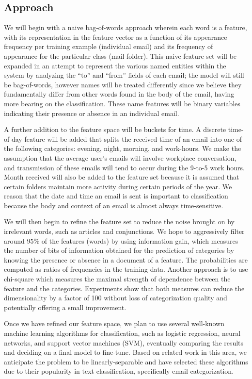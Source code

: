 \documentclass[11pt]{article}
\begin{document}
\subsection{Approach}
\label{sec-1-2}
We will begin with a naive bag-of-words approach wherein each word is a feature, with its representation in the feature vector as a function of its appearance frequency per training example (individual email) and its frequency of appearance for the particular class (mail folder). This naive feature set will be expanded in an attempt to represent the various named entities within the system by analyzing the “to” and “from” fields of each email; the model will still be bag-of-words, however names will be treated differently since we believe they fundamentally differ from other words found in the body of the email, having more bearing on the classification. These name features will be binary variables indicating their presence or absence in an individual email.  

A further addition to the feature space will be buckets for time. A discrete time-of-day feature will be added that splits the received time of an email into one of the following categories: evening, night, morning, and work-hours. We make the assumption that the average user's emails will involve workplace conversation, and transmission of these emails will tend to occur during the 9-to-5 work hours. Month received will also be added to the feature set because it is assumed that certain folders maintain more activity during certain periods of the year. We reason that the date and time an email is sent is important to classification because the body and context of an email is almost always time-sensitive.

We will then begin to refine the feature set to reduce the noise brought on by irrelevant words, such as articles and conjunctions. We hope to aggressively filter around 95\% of the features (words) by using information gain, which measures the number of bits of information obtained for the prediction of categories by knowing the presence or absence in a document of a feature. The probabilities are computed as ratios of frequencies in the training data. Another approach is to use chi-square which measures the maximal strength of dependence between the feature and the categories. Experiments show that both measures can reduce the dimensionality by a factor of 100 without loss of categorization quality and potentially offering a small improvement.

Once we have refined our feature space, we plan to use several well-known machine learning algorithms for classification, such as logistic regression, neural networks, and support vector machines (SVM), eventually comparing the results and deciding on a final model to fine-tune. Based on related work in this area, we anticipate the problem to be linearly-separable and have selected these algorithms due to their popularity in text classification, specifically email categorization.
\end{document}

